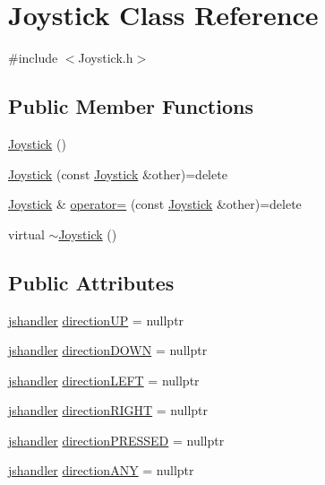 \hypertarget{class_joystick}{}\section{Joystick Class Reference}
\label{class_joystick}


{\ttfamily \#include $<$Joystick.\+h$>$}

\subsection*{Public Member Functions}
\begin{DoxyCompactItemize}
\item 
\hyperlink{class_joystick_a158b1f77b78717efbf1b8fac43b1fcef}{Joystick} ()
\item 
\hyperlink{class_joystick_aee767adfa96c50ebb6ca1af13ddb6187}{Joystick} (const \hyperlink{class_joystick}{Joystick} \&other)=delete
\item 
\hyperlink{class_joystick}{Joystick} \& \hyperlink{class_joystick_ad5b1112a556aba93875e60e70a2f6643}{operator=} (const \hyperlink{class_joystick}{Joystick} \&other)=delete
\item 
virtual \hyperlink{class_joystick_a23429c0470e1a32b8de61e1ad7c251c1}{$\sim$\+Joystick} ()
\end{DoxyCompactItemize}
\subsection*{Public Attributes}
\begin{DoxyCompactItemize}
\item 
\hyperlink{_joystick_8h_a76b70dda4842c659a65f6b5ebf8685c6}{jshandler} \hyperlink{class_joystick_a24b286e28a1e3ada2bc42c4b1ef16339}{direction\+UP} = nullptr
\item 
\hyperlink{_joystick_8h_a76b70dda4842c659a65f6b5ebf8685c6}{jshandler} \hyperlink{class_joystick_aca32b8875e35bd9af63065e0d5dfafb9}{direction\+D\+O\+WN} = nullptr
\item 
\hyperlink{_joystick_8h_a76b70dda4842c659a65f6b5ebf8685c6}{jshandler} \hyperlink{class_joystick_a0a7fa96faefa92d2f2e09251b460b5ed}{direction\+L\+E\+FT} = nullptr
\item 
\hyperlink{_joystick_8h_a76b70dda4842c659a65f6b5ebf8685c6}{jshandler} \hyperlink{class_joystick_a6fcd661de0e47977ebfddd1950004bd1}{direction\+R\+I\+G\+HT} = nullptr
\item 
\hyperlink{_joystick_8h_a76b70dda4842c659a65f6b5ebf8685c6}{jshandler} \hyperlink{class_joystick_ab7b8181af7f4b77fe567c9fe2b00cf89}{direction\+P\+R\+E\+S\+S\+ED} = nullptr
\item 
\hyperlink{_joystick_8h_a76b70dda4842c659a65f6b5ebf8685c6}{jshandler} \hyperlink{class_joystick_a9699d1491b81b53353a30cfc675ef188}{direction\+A\+NY} = nullptr
\end{DoxyCompactItemize}
